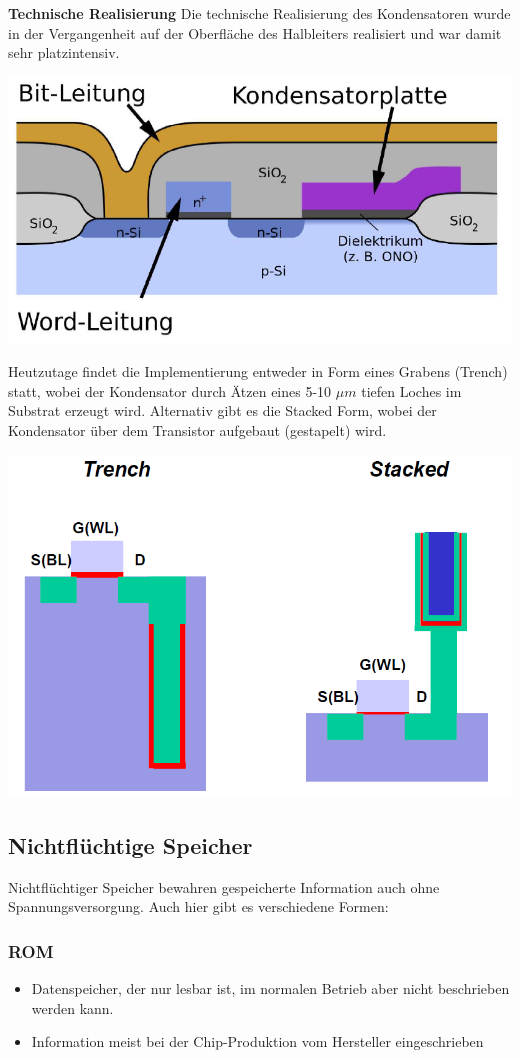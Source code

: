 		\textbf{Technische Realisierung}
		\newline
		Die technische Realisierung des Kondensatoren wurde in der Vergangenheit auf der Oberfläche des Halbleiters realisiert und war damit sehr platzintensiv. 
		\begin{center}
			\includegraphics[width=0.3\linewidth]{Kapitel/Kap07/Condensatorimplmentierung_Alt}
		\end{center}
		
		Heutzutage findet die Implementierung entweder in Form eines Grabens (Trench) statt, wobei der Kondensator durch Ätzen eines 5-10 $\mu m$ tiefen Loches im Substrat erzeugt wird. 
		\newline
		Alternativ gibt es die Stacked Form, wobei der Kondensator über dem Transistor aufgebaut (gestapelt) wird.
		
		\begin{center}
			\includegraphics[width=0.4\linewidth]{Kapitel/Kap07/TrenchAndStack}
		\end{center}
		

\subsection{Nichtflüchtige Speicher}
	Nichtflüchtiger Speicher bewahren gespeicherte Information auch ohne Spannungsversorgung.
	Auch hier gibt es verschiedene Formen:
	\subsubsection{ROM}
		\begin{itemize}
			\item Datenspeicher, der nur lesbar ist, im normalen Betrieb aber nicht beschrieben werden kann.
			\item Information meist bei der Chip-Produktion vom Hersteller eingeschrieben
		\end{itemize}
